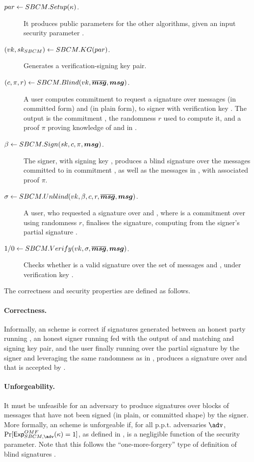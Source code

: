 \begin{description}
\item[$par \gets SBCM.Setup(\kappa)$.] It produces public parameters
  for the other algorithms, given an input security parameter \SBCMsecpar.
\item[$(vk,sk_{SBCM}) \gets SBCM.KG(par)$.] Generates a
  verification-signing key pair.
\item[$(c,\pi,r) \gets SBCM.Blind(vk,\overline{\boldsymbol{msg}},\boldsymbol{msg})$.] A user
  computes commitment \Ccom to request a signature over messages \osmsg (in
  committed form) and \smsg (in plain form), to signer with verification key
  \vk. The output is the commitment \Ccom, the randomness $r$ used to
  compute it, and a proof $\pi$ proving knowledge of \osmsg and \smsg in
  \Ccom.
\item[$\beta \gets SBCM.Sign(sk,c,\pi,\boldsymbol{msg})$.] The
  signer, with signing key \sk, produces a blind signature \bsig over
  the messages committed to in commitment \Ccom, as well as the messages in
  \smsg, with associated proof $\pi$.
\item[$\sigma \gets SBCM.Unblind(vk,\beta,c,r,\overline{\boldsymbol{msg}},\boldsymbol{msg})$.]
  A user, who requested a signature over \osmsg and \smsg, where \Ccom is a
  commitment over \osmsg using randomness $r$, finalises the signature,
  computing \sig from the signer's partial signature \bsig.
\item[$1/0 \gets SBCM.Verify(vk,\sigma,\overline{\boldsymbol{msg}},\boldsymbol{msg})$.] Checks
  whether \sig is a valid signature over the set of messages \osmsg and
  \smsg, under verification key \vk.
\end{description}

The correctness and security properties are defined as follows.

\paragraph{Correctness.} %
Informally, an \SBCM scheme is correct if signatures generated between an honest
party running \SBCMBlind, an honest signer running \SBCMSign fed with the output
of \SBCMBlind and matching \smsg and signing key pair, and the user finally
running \SBCMUnblind over the partial signature by the signer and leveraging
the same randomness as in \SBCMBlind, produces a signature over \osmsg and \smsg
that is accepted by \SBCMVerify. 

\paragraph{Unforgeability.} %
It must be unfeasible for an adversary to produce signatures over blocks of
messages that have not been signed (in plain, or committed shape) by the
signer. More formally, an \SBCM scheme is unforgeable if, for all p.p.t.
adversaries $\adv$, $\Pr[\ExpSBCMOMF(\secpar) = 1]$, as defined in
, is a negligible function of the security parameter.
Note that this follows the ``one-more-forgery'' type of definition of blind
signatures \cite{bold02}.

